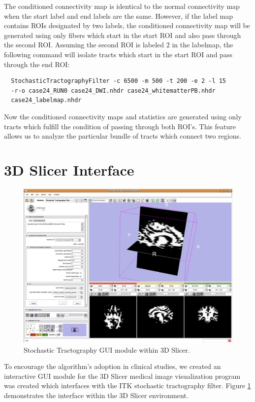The conditioned connectivity map is identical to the normal connectivity map when the start label and end labels are the same.  However, if the label map contains ROIs designated by two labels, the conditioned connectivity map will be generated using only fibers which start in the start ROI and also pass through the second ROI.  Assuming the second ROI is labeled $2$ in the labelmap, the following command will isolate tracts which start in the start ROI and pass through the end ROI:
\begin{verbatim}
  StochasticTractographyFilter -c 6500 -m 500 -t 200 -e 2 -l 15
  -r-o case24_RUN0 case24_DWI.nhdr case24_whitematterPB.nhdr
  case24_labelmap.nhdr
\end{verbatim}

Now the conditioned connectivity maps and statistics are generated using only tracts which fulfill the condition of passing through both ROI's.  This feature allows us to analyze the particular bundle of tracts which connect two regions.
 
\section{3D Slicer Interface}
\begin{figure}
  \center
	\includegraphics[width=0.5\linewidth]{slicermodule}
	\caption{Stochastic Tractography GUI module within 3D Slicer.}
	\label{fig:slicermodule}
\end{figure}
To encourage the algorithm's adoption in clinical studies, we created an interactive GUI module for the 3D Slicer medical image visualization program was created which interfaces with the ITK stochastic tractography filter.  Figure \ref{fig:slicermodule} demonstrates the interface within the 3D Slicer environment.

